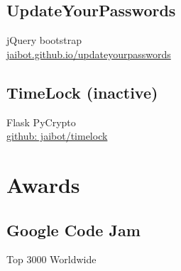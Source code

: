 \documentclass[]{resume}
\begin{document}
\begin{minipage}[t]{0.33\textwidth}
\subsection{UpdateYourPasswords}
jQuery \textbullet{} bootstrap\\
\href{http://jaibot.github.io/updateyourpasswords}{jaibot.github.io/updateyourpasswords}
\sectionsep

\subsection{TimeLock (inactive)}
Flask \textbullet{} PyCrypto \\
\href{http://github.com/jaibot/timelock}{github: jaibot/timelock}

\sectionsep







\section{Awards}
\subsection{Google Code Jam}
Top 3000 Worldwide \\
\sectionsep

\end{minipage}
\end{document}
